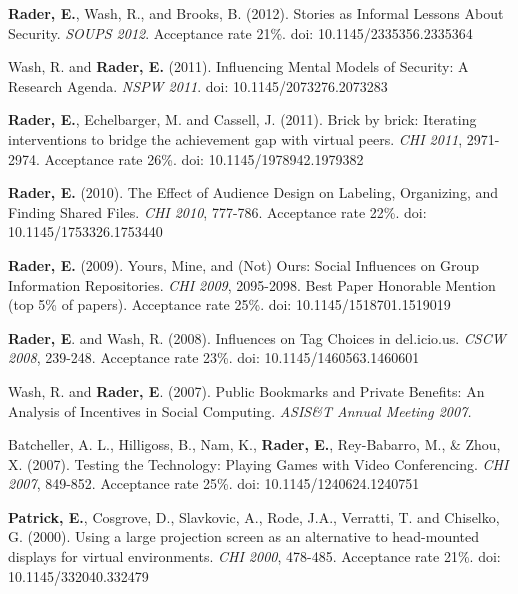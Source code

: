 \documentclass[9pt]{extarticle}
\makeatletter
\renewcommand{\section}{%
  \@startsection{section}{1}{0em}{\baselineskip}{3pt}{\large\bfseries\textsc}}
\makeatother
\begin{document}
\textbf{Rader, E.}, Wash, R., and Brooks, B. (2012). Stories as Informal Lessons About Security. \emph{SOUPS 2012}. Acceptance rate 21\%. doi: 10.1145/2335356.2335364

Wash, R. and \textbf{Rader, E.} (2011). Influencing Mental Models of Security: A Research Agenda. \emph{NSPW 2011}. doi: 10.1145/2073276.2073283

\textbf{Rader, E.}, Echelbarger, M. and Cassell, J. (2011). Brick by brick: Iterating interventions to bridge the achievement gap with virtual peers. \emph{CHI 2011}, 2971-2974. Acceptance rate 26\%. doi: 10.1145/1978942.1979382

\textbf{Rader, E.} (2010). The Effect of Audience Design on Labeling, Organizing, and Finding Shared Files. \emph{CHI 2010}, 777-786. Acceptance rate 22\%. doi: 10.1145/1753326.1753440

\textbf{Rader, E.} (2009). Yours, Mine, and (Not) Ours: Social Influences on Group Information Repositories. \emph{CHI 2009}, 2095-2098. Best Paper Honorable Mention (top 5\% of papers). Acceptance rate 25\%. doi: 10.1145/1518701.1519019

\textbf{Rader, E}. and Wash, R. (2008). Influences on Tag Choices in del.icio.us. \emph{CSCW 2008}, 239-248. Acceptance rate 23\%. doi: 10.1145/1460563.1460601

Wash, R. and \textbf{Rader, E}. (2007). Public Bookmarks and Private Benefits: An Analysis of Incentives in Social Computing. \emph{ASIS\&T Annual Meeting 2007.}

Batcheller, A. L., Hilligoss, B., Nam, K., \textbf{Rader, E.}, Rey-Babarro, M., \& Zhou, X. (2007). Testing the Technology: Playing Games with Video Conferencing. \emph{CHI 2007}, 849-852. Acceptance rate 25\%. doi: 10.1145/1240624.1240751

\textbf{Patrick, E.}, Cosgrove, D., Slavkovic, A., Rode, J.A., Verratti, T. and Chiselko, G. (2000). Using a large projection screen as an alternative to head-mounted displays for virtual environments. \emph{CHI 2000}, 478-485. Acceptance rate 21\%. doi: 10.1145/332040.332479

%
%
%
\end{document}
